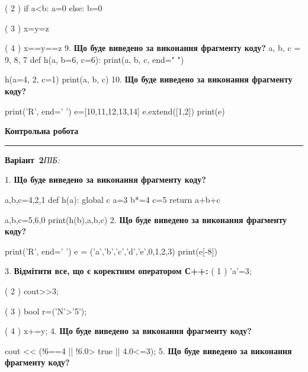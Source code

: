 \documentclass[11pt]{article}
\begin{document}
( 2 ) if a<b: a=0 else: b=0

( 3 ) x=y=z

( 4 ) x==y==z
\vspace{5mm}
9. \textbf{Що буде виведено за виконання фрагменту коду?}
a, b, c = 9, 8, 7
def h(a, b=6, c=6):
    print(a, b, c, end=" ")

h(a=4, 2, c=1)
print(a, b, c)
\vspace{5mm}
10. \textbf{Що буде виведено за виконання фрагменту коду?}

print('R', end=' ')
e=[10,11,12,13,14]
e.extend([1,2])
print(e)

\vspace{5mm}










\newpage

\newpage

{\centering\Large\bfseries Контрольна робота\par}
\medskip
\noindent\rule{\linewidth}{0.5pt}
\smallskip
\noindent\textbf{Варіант \No\,2}\hfill \textit{ПІБ:}\,\underline{\hspace{60mm}}
\vspace{4mm}

1. \textbf{Що буде виведено за виконання фрагменту коду?}

a,b,c=4,2,1
def h(a):
global c    a=3
    b*=4
    c=5
    return a+b+c

a,b,c=5,6,0
print(h(b),a,b,c)
\vspace{5mm}
2. \textbf{Що буде виведено за виконання фрагменту коду?}

print('R', end=' ')
e = ('a','b','c','d','e',0,1,2,3)
print(e[-8])

\vspace{5mm}
3. %
\textbf{Відмітити все, що є коректним оператором С++:}
( 1 ) 'a'=3;

( 2 ) cout>>3;

( 3 ) bool r=('N'>'5');

( 4 ) x+=y;
\vspace{5mm}
4. \textbf{Що буде виведено за виконання фрагменту коду?}

cout << (!6==4 || !6.0> true || 4.0<=3);
\vspace{5mm}
5. \textbf{Що буде виведено за виконання фрагменту коду?}
\end{document}
